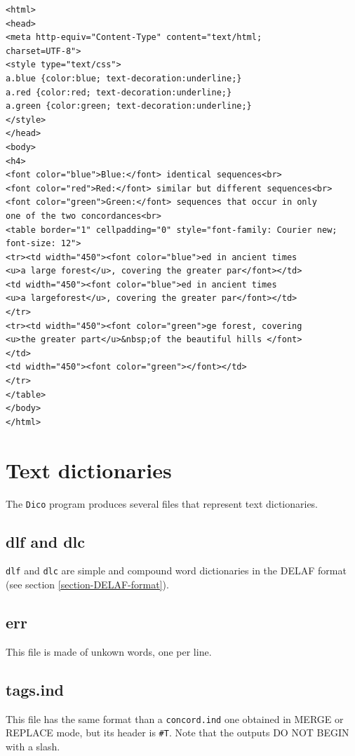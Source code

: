 \begin{verbatim}
<html>
<head>
<meta http-equiv="Content-Type" content="text/html;
charset=UTF-8">
<style type="text/css">
a.blue {color:blue; text-decoration:underline;}
a.red {color:red; text-decoration:underline;}
a.green {color:green; text-decoration:underline;}
</style>
</head>
<body>
<h4>
<font color="blue">Blue:</font> identical sequences<br>
<font color="red">Red:</font> similar but different sequences<br>
<font color="green">Green:</font> sequences that occur in only
one of the two concordances<br>
<table border="1" cellpadding="0" style="font-family: Courier new;
font-size: 12">
<tr><td width="450"><font color="blue">ed in ancient times
<u>a large forest</u>, covering the greater par</font></td>
<td width="450"><font color="blue">ed in ancient times
<u>a largeforest</u>, covering the greater par</font></td>
</tr>
<tr><td width="450"><font color="green">ge forest, covering
<u>the greater part</u>&nbsp;of the beautiful hills </font>
</td>
<td width="450"><font color="green"></font></td>
</tr>
</table>
</body>
</html>
\end{verbatim}


\section{Text dictionaries}
The \verb+Dico+ program produces several files that represent text dictionaries.

\subsection{dlf and dlc}

\verb+dlf+ and \verb+dlc+ are simple and compound word dictionaries in the DELAF
format (see section \ref{section-DELAF-format}).

\subsection{err}
This file is made of unkown words, one per line.

\subsection{tags.ind}
\label{section-tags-ind}
This file has the same format than a \verb+concord.ind+ one obtained in MERGE
or REPLACE mode, but its header is \verb+#T+. Note that the outputs DO NOT BEGIN
with a slash.
 


